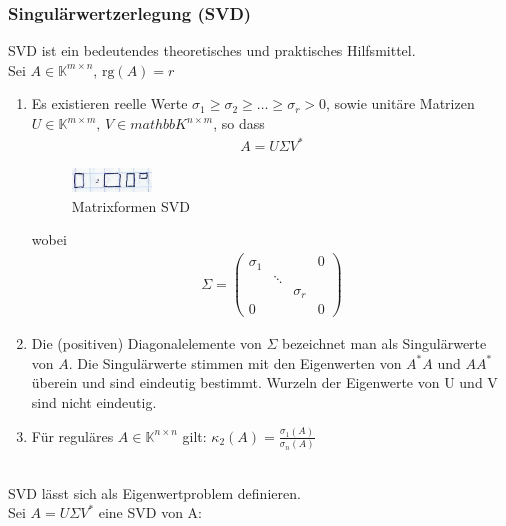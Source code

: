 \subsubsection{Singulärwertzerlegung (SVD)}
SVD ist ein bedeutendes theoretisches und praktisches Hilfsmittel.\\
\satz Sei $A \in \mathbb{K}^{m \times n}$, $\mathrm{rg}(A) = r$\\
\begin{enumerate}
  \item{Es existieren reelle Werte $\sigma_1 \geq \sigma_2 \geq \ldots \geq \sigma_r > 0$, sowie
      unitäre Matrizen $U \in \mathbb{K}^{m \times m}, \, V \in mathbb{K}^{n \times m}$, so dass
      \begin{align*}
        A = U \Sigma V^* \tag{SVD}
      \end{align*}
      \begin{figure}[htbp]
        \centering
        \includegraphics[width=0.2\textwidth]{figures/svd.png}
        \caption{Matrixformen SVD}
      \end{figure}
      wobei
      \begin{align*}
        \Sigma = \begin{pmatrix}
          \sigma_1 &        &          & 0 \\
                   & \ddots &          &   \\
                   &        & \sigma_r &   \\
          0        &        &          & 0
        \end{pmatrix}
      \end{align*}}
  \item{Die (positiven) Diagonalelemente von $\Sigma$ bezeichnet man als Singulärwerte von $A$.
      Die Singulärwerte stimmen mit den Eigenwerten von $A^*A$ und $AA^*$ überein und sind eindeutig
      bestimmt. Wurzeln der Eigenwerte von U und V sind nicht eindeutig.}
    \item Für reguläres $A \in \mathbb{K}^{n \times n}$ gilt: $\kappa_2(A) = \frac{\sigma_1(A)}{\sigma_n(A)}$
\end{enumerate}
\\
SVD lässt sich als Eigenwertproblem definieren.\\
Sei $A = U \Sigma V^*$ eine SVD von A:
